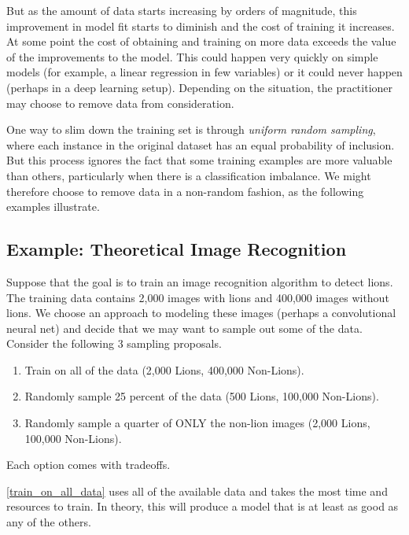 \documentclass[twoside]{article}
\begin{document}
But as the amount of data starts increasing by orders of magnitude, this improvement in model fit starts to diminish and the cost of training it increases. At some point the cost of obtaining and training on more data exceeds the value of the improvements to the model. This could happen very quickly on simple models (for example, a linear regression in few variables) or it could never happen (perhaps in a deep learning setup). Depending on the situation, the practitioner may choose to remove data from consideration.

One way to slim down the training set is through \textit{uniform random sampling}, where each instance in the original dataset has an equal probability of inclusion. But this process ignores the fact that some training examples are more valuable than others, particularly when there is a classification imbalance. We might therefore choose to remove data in a non-random fashion, as the following examples illustrate.

\subsection{Example: Theoretical Image Recognition}
\label{section:lion}

Suppose that the goal is to train an image recognition algorithm to detect lions. The training data contains 2,000 images with lions and 400,000 images without lions. We choose an approach to modeling these images (perhaps a convolutional neural net) and decide that we may want to sample out some of the data. Consider the following 3 sampling proposals.

\begin{enumerate}[label=(\Alph*)]
\item \label{train_on_all_data} Train on all of the data (2,000 Lions, 400,000 Non-Lions).
\item \label{train_on_randomly_sampled}Randomly sample 25 percent of the data (500 Lions, 100,000 Non-Lions).
\item \label{training_on_non_rs} Randomly sample a quarter of ONLY the non-lion images (2,000 Lions, 100,000 Non-Lions).
\end{enumerate}

Each option comes with tradeoffs.

\ref{train_on_all_data} uses all of the available data and takes the most time and resources to train. In theory, this will produce a model that is at least as good as any of the others.
\end{document}
